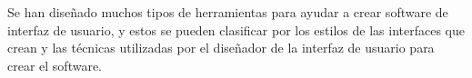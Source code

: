 Se han diseñado muchos tipos de herramientas para ayudar a crear software de interfaz de usuario, y estos se pueden clasificar por los estilos de las interfaces que crean y las técnicas utilizadas por el diseñador de la interfaz de usuario para crear el software.





